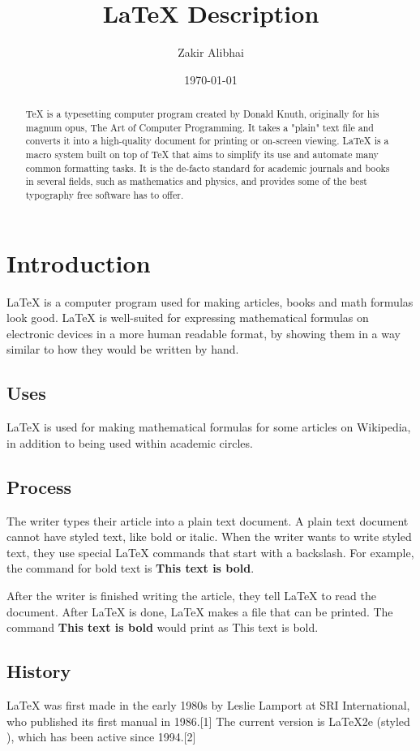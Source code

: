 \documentclass[letterpaper,notitlepage,11pt]{article}
\begin{document}
\title{LaTeX Description}
\author{Zakir Alibhai}
\date{\today}
\maketitle
\begin{abstract}
TeX is a typesetting computer program created by Donald Knuth, originally for his magnum opus, The Art of Computer Programming. It takes a "plain" text file and converts it into a high-quality document for printing or on-screen viewing. LaTeX is a macro system built on top of TeX that aims to simplify its use and automate many common formatting tasks. It is the de-facto standard for academic journals and books in several fields, such as mathematics and physics, and provides some of the best typography free software has to offer.
\end{abstract}
\section{Introduction}
LaTeX is a computer program used for making articles, books and math formulas look good. LaTeX is well-suited for expressing mathematical formulas on electronic devices in a more human readable format, by showing them in a way similar to how they would be written by hand.
\subsection{Uses}
LaTeX is used for making mathematical formulas for some articles on Wikipedia, in addition to being used within academic circles.
\subsection{Process}
The writer types their article into a plain text document. A plain text document cannot have styled text, like bold or italic. When the writer wants to write styled text, they use special LaTeX commands that start with a backslash. For example, the command for bold text is \textbf{This text is bold}.

After the writer is finished writing the article, they tell LaTeX to read the document. After LaTeX is done, LaTeX makes a file that can be printed. The command \textbf{This text is bold} would print as This text is bold.

\newpage 

\subsection{History}
LaTeX was first made in the early 1980s by Leslie Lamport at SRI International, who published its first manual in 1986.[1] The current version is LaTeX2e (styled \LaTeXe), which has been active since 1994.[2]
\end{document}
